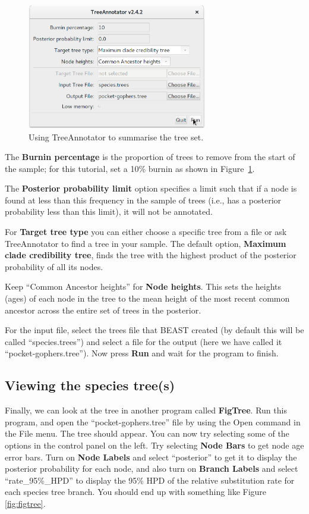 \documentclass{article}
\begin{document}
\begin{figure}[htb!]
\centering
\includegraphics[width=0.7\textwidth]{figures/treeannotator.png}
\caption{Using TreeAnnotator to summarise the tree set.}
\label{fig:treeannotator}
\end{figure}

The \textbf{Burnin percentage} is the proportion of trees to remove from the
start of the sample; for this tutorial, set a 10\% burnin as shown in
Figure~\ref{fig:treeannotator}.

The \textbf{Posterior probability limit} option specifies a limit such that if a
node is found at less than this frequency in the sample of trees (i.e., has a
posterior probability less than this limit), it will not be annotated.

For \textbf{Target tree type} you can either choose a specific tree from a file
or ask TreeAnnotator to find a tree in your sample. The default option,
\textbf{Maximum clade credibility tree}, finds the tree with the highest product
of the posterior probability of all its nodes.

Keep ``Common Ancestor heights'' for \textbf{Node heights}. This sets the
heights (ages) of each node in the tree to the mean height of the most recent
common ancestor across the entire set of trees in the posterior.

For the input file, select the trees file that BEAST created (by default this
will be called ``species.trees'') and select a file for the output (here we
have called it ``pocket-gophers.tree''). Now press \textbf{Run} and wait for the
program to finish.

\subsection*{Viewing the species tree(s)}

Finally, we can look at the tree in another program called \textbf{FigTree}. Run
this program, and open the ``pocket-gophers.tree'' file by using the Open command
in the File menu. The tree should appear. You can now try selecting some of the
options in the control panel on the left. Try selecting \textbf{Node Bars} to
get node age error bars. Turn on \textbf{Node Labels} and select
``posterior'' to get it to display the posterior probability for each node,
and also turn on \textbf{Branch Labels} and select ``rate\_95\%\_HPD'' to display
the 95\% HPD of the relative substitution rate for each species tree branch.
You should end up with something like Figure \ref{fig:figtree}.
\end{document}
